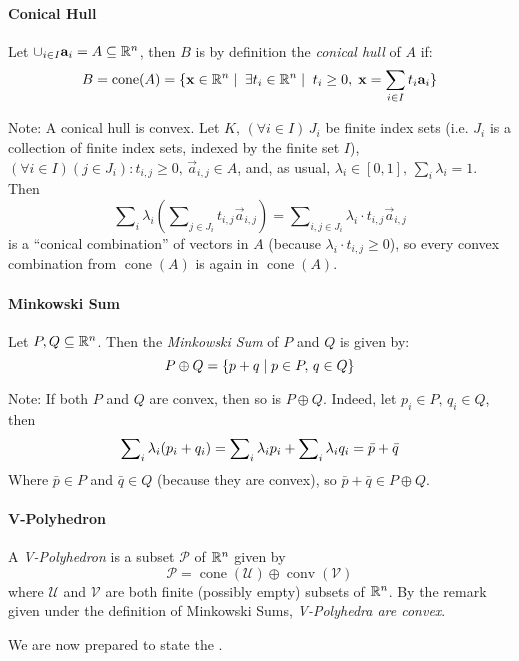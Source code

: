 \documentclass[a4,fleqn]{article}
\DeclareMathOperator{\conv}{conv}
\DeclareMathOperator{\cone}{cone}
\begin{document}
\paragraph{Conical Hull}  Let $\cup_{i\in I} \mathbf{a}_i = A \subseteq \mathbb{R}^n$, then $B$ is by definition the \textit{conical hull} of $A$ if:
  \[ B = \cone(A) = \{ \vec{x}\in \R^n \suchthat\; \exists t_i \in \R^n \suchthat \; t_i \geq 0,\; \vec{x} = \sum_{i\in I} t_i\vec{a}_i \} \]

Note: A conical hull is convex.  Let $K,\, (\forall i\in I)\, J_i$ be finite index sets (i.e. $J_i$ is a collection of finite index sets, indexed by the finite set $I$), $(\forall i \in I)(j \in J_i): t_{i,j} \geq 0,\, \vec{a}_{i,j} \in A$, and, as usual, $\lambda_i \in [0,1],\, \sum_i \lambda_i = 1$.  Then
  \[ \sum\nolimits_i \lambda_i \left(\sum\nolimits_{j \in J_i} t_{i,j} \vec{a}_{i,j}\right) = \sum\nolimits_{i,j\in J_i} \lambda_i \cdot t_{i,j} \vec{a}_{i,j}\]
is a ``conical combination'' of vectors in $A$ (because $\lambda_i\cdot t_{i,j} \geq 0$), so every convex combination from $\cone(A)$ is again in $\cone(A)$.

\paragraph{Minkowski Sum}
Let $P,Q \subseteq \mathbb{R}^n$.  Then the \textit{Minkowski Sum} of $P$ and $Q$ is given by:
  \[ P \oplus Q = \{ p + q \;|\; p \in P,\, q \in Q \} \]

Note:  If both $P$ and $Q$ are convex, then so is $P \oplus Q$.  Indeed, let $p_i \in P,\, q_i \in Q$, then
  \[\sum_i\nolimits \lambda_i(p_i + q_i) = 
  \sum\nolimits_{i} \lambda_{i} p_{i} + \sum\nolimits_{i} \lambda_{i} q_{i} = 
  \bar{p} + \bar{q}
  \]
Where $\bar{p} \in P$ and $\bar{q} \in Q$ (because they are convex), so $\bar{p} + \bar{q} \in P \oplus Q$.

\paragraph{V-Polyhedron}  A \textit{V-Polyhedron} is a subset $\mathcal{P}$ of $\mathbb{R}^n$ given by 
  \[ \mathcal{P} = \cone(\mathcal{U}) \oplus \conv(\mathcal{V}) \] 
where $\mathcal{U}$ and $\mathcal{V}$ are both finite (possibly empty) subsets of $\mathbb{R}^n$.  By the remark given under the definition of Minkowski Sums, \textit{V-Polyhedra are convex}.

\bigskip
\noindent We are now prepared to state the \MWT.
\end{document}
